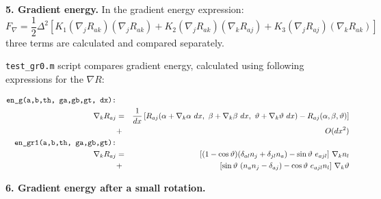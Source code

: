 \documentclass[a4paper]{article}
\def\ct{\cos\vartheta}
\def\st{\sin\vartheta}
\begin{document}
{\bf 5. Gradient energy.} In the gradient energy expression:
$$
F_\nabla \label{eq:He3_en_g}
= \frac12 \Delta^2 \left[
  K_1 (\nabla_j R_{ak})(\nabla_j R_{ak})
+ K_2 (\nabla_j R_{ak})(\nabla_k R_{aj})
+ K_3 (\nabla_j R_{aj})(\nabla_k R_{ak}) \right]
$$
three terms are calculated and compared separately.

{\tt test\_gr0.m} script compares gradient energy, calculated using following
expressions for the $\nabla R$:

\begin{eqnarray*}
\mbox{\tt en\_g(a,b,th, ga,gb,gt, dx):} &&\\
\nabla_k R_{aj} &=&
\frac{1}{dx}\left[
R_{aj}(\alpha+\nabla_k\alpha\ dx,\ \beta+\nabla_k\beta\ dx,\ \vartheta+\nabla_k\vartheta\ dx) -
R_{aj}(\alpha, \beta, \vartheta)\right]\\
&+& O(dx^2)
\\
\mbox{\tt en\_gr1(a,b,th, ga,gb,gt):} &&\\
\nabla_k R_{aj} &=&
 [(1-\ct)(\delta_{al} n_j + \delta_{jl} n_a) - \st\ e_{ajl}]\ \nabla_k n_l\\
&+& [\st\ (n_a n_j - \delta_{aj}) - \ct\ e_{ajl} n_l]\ \nabla_k \vartheta
\end{eqnarray*}

{\bf 6. Gradient energy after a small rotation.} 
\end{document}
